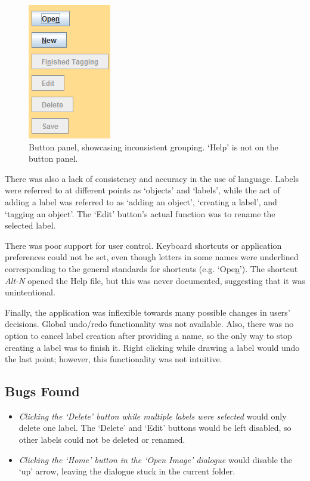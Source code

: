 \documentclass[11pt,twocolumn]{article}
\begin{document}
\begin{figure}[h!]
\centering
\includegraphics[scale=0.8]{buttonpanel.png}
\caption{Button panel, showcasing inconsistent grouping. `Help' is not on the button panel.}
\end{figure}

There was also a lack of consistency and accuracy in the use of language. Labels were referred to at different points as `objects' and `labels', while the act of adding a label was referred to as `adding an object', `creating a label', and `tagging an object'. The `Edit' button's actual function was to rename the selected label.

There was poor support for user control. Keyboard shortcuts or application preferences could not be set, even though letters in some names were underlined corresponding to the general standards for shortcuts (e.g. `Ope\underline{n}'). The shortcut \emph{Alt-N} opened the Help file, but this was never documented, suggesting that it was unintentional.

Finally, the application was inflexible towards many possible changes in users' decisions. Global undo/redo functionality was not available. Also, there was no option to cancel label creation after providing a name, so the only way to stop creating a label was to finish it. Right clicking while drawing a label would undo the last point; however, this functionality was not intuitive. 

\subsection{Bugs Found}

\begin{itemize}
\item \emph{Clicking the `Delete' button while multiple labels were selected} would only delete one label. The `Delete' and `Edit' buttons would be left disabled, so other labels could not be deleted or renamed.
\item \emph{Clicking the `Home' button in the `Open Image' dialogue} would disable the `up' arrow, leaving the dialogue stuck in the current folder.
\end{itemize}
\end{document}
